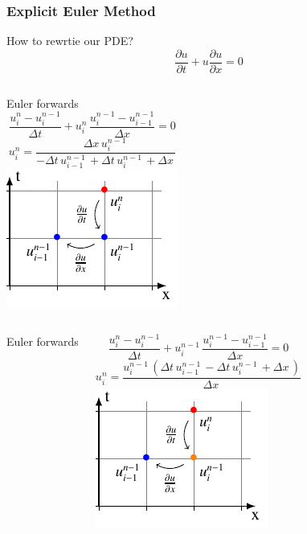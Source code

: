 %
%
%

\begin{frame}
  \frametitle{Explicit Euler Method}
  How to rewrtie our PDE?
  $$ \frac {\partial u}{\partial t}+u{\frac {\partial u}{\partial x}}=0 $$

\end{frame}



\begin{frame}
  \begin{columns}
    Euler forwards
  $$\frac{u_{i}^{n}-u_{i}^{n-1}}{\Delta t}+ u_{i}^{n}\, \frac{u_{i}^{n-1}-u_{i-1}^{n-1}}{\Delta x}=0$$
  $$ u_{i}^{n} = \frac{\Delta{x}\, u^{n-1}_{i}\,}{- \Delta{t}\, u^{n-1}_{i-1}\, + \Delta{t}\, u^{n-1}_{i}\, + \Delta{x}\,}$$
    \includegraphics[height=\textheight]{../BurgersEquation/tikz/linear1/linear1.pdf}\\
  \end{columns}
\end{frame}

\begin{frame}
  \begin{columns}
    Euler forwards

  $$\frac{u_{i}^{n}-u_{i}^{n-1}}{\Delta t}+ u_{i}^{n-1}\, \frac{u_{i}^{n-1}-u_{i-1}^{n-1}}{\Delta x}=0$$
  $$ u_{i}^{n} = \frac{u^{n-1}_{i}\, \left(\Delta{t}\, u^{n-1}_{i-1}\, - \Delta{t}\, u^{n-1}_{i}\, + \Delta{x}\,\right)}{\Delta{x}\,}$$
    \includegraphics[height=\textheight]{../BurgersEquation/tikz/linear2/linear2.pdf}\\
  \end{columns}
\end{frame}


